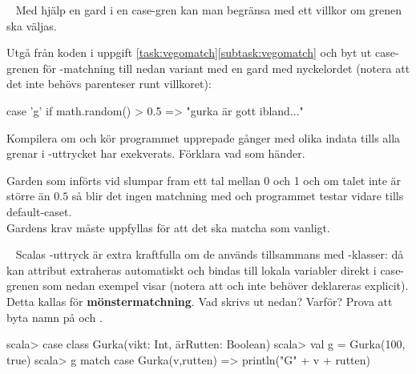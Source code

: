 \QUESTEND







\QUESTBEGIN

\Task  \what~  Med hjälp en gard  i en case-gren kan man begränsa med ett villkor om grenen ska väljas.

Utgå från koden i uppgift \ref{task:vegomatch}\ref{subtask:vegomatch} och byt ut case-grenen för -matchning till nedan variant med en gard med nyckelordet  (notera att det inte behövs parenteser runt villkoret):
\begin{Code}
    case 'g' if math.random() > 0.5 => "gurka är gott ibland..."
\end{Code}
Kompilera om och kör programmet upprepade gånger med olika indata tills alla grenar i -uttrycket har exekverats. Förklara vad som händer.

\SOLUTION


\TaskSolved \what

Garden som införts vid  slumpar fram ett tal mellan 0 och 1 och om talet inte är större än $0.5$ så blir det ingen matchning med  och programmet testar vidare tills default-caset.\\
Gardens krav måste uppfyllas för att det ska matcha som vanligt.



\QUESTEND







\QUESTBEGIN


\Task \label{task:match-caseclass} \what~   Scalas -uttryck är extra kraftfulla om de används tillsammans med -klasser: då kan attribut extraheras automatiskt och bindas till lokala variabler direkt i case-grenen som nedan exempel visar (notera att  och  inte behöver deklareras explicit). Detta kallas för \textbf{mönstermatchning}. 
Vad skrivs ut nedan? Varför? Prova att byta namn på  och .
\begin{REPL}
scala> case class Gurka(vikt: Int, ärRutten: Boolean)
scala> val g = Gurka(100, true)
scala> g match { case Gurka(v,rutten) => println("G" + v + rutten) }
\end{REPL}

